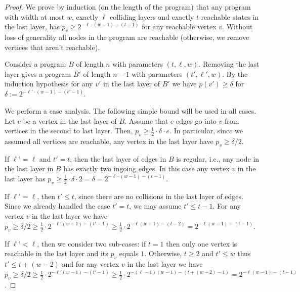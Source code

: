 \begin{proof}
	We prove by induction (on the length of the program) that any program with width at most $w$,  exactly $\ell$ colliding layers and exactly $t$ reachable states in the last layer, has $p_v \ge 2^{-\ell\cdot(w-1) -(t-1)}$ for any reachable vertex $v$.
	Without loss of generality all nodes in the program are reachable (otherwise, we remove vertices that aren't reachable).
	
	Consider a program $B$ of length $n$ with  parameters $(t, \ell,w)$.
	Removing the last layer gives a program $B'$ of length $n-1$ with parameters $(t',\ell',w)$. By the induction hypothesis for any $v'$ in the last layer of $B'$ we have $p(v')\ge \delta$ for $\delta := 2^{-\ell'\cdot(w-1) -(t'-1)}$.
	
	We perform a case analysis. The following simple bound will be used in all cases. Let $v$ be a vertex in the last layer of $B$. Assume that $e$ edges go into $v$ from vertices in the second to last layer. Then, $p_v \ge \frac{1}{2} \cdot \delta \cdot e$. In particular, since we assumed all vertices are reachable, any vertex in the last layer have $p_v \ge \delta/2$. 

	If $\ell'=\ell$ and $t' = t$, then the last layer of edges in $B$ is regular, i.e., any node in the last layer in $B$ has exactly two ingoing edges. In this case any vertex $v$ in the last layer has  $p_v \ge \frac{1}{2} \cdot \delta\cdot 2= \delta = 2^{-\ell\cdot(w-1) - (t-1)}$.
	
	If $\ell'=\ell$, then $t' \le t$, since there are no collisions in the last layer of edges. Since we already handled the case $t'=t$, we may assume $t'\le t-1$.
	For any vertex $v$ in the last layer we have 
	$p_v \ge \delta/2 
	 \ge \frac{1}{2} \cdot 2^{-\ell'(w-1)-(t'-1)}
	 \ge \frac{1}{2} \cdot 2^{-\ell(w-1)-(t-2)} 
	 = 2^{-\ell(w-1)-(t-1)}$.
	
	If $\ell'<\ell$, then we consider two sub-cases:
	if $t = 1$ then only one vertex is reachable in the last layer and its $p_v$ equals $1$.
	Otherwise, $t\ge 2$ and $t'\le w$ thus $t' \le t+(w-2)$ and 
	 for any  vertex $v$ in the last layer we have  $p_v \ge \delta/2
	 \ge \frac{1}{2} \cdot 2^{-\ell'(w-1)-(t'-1)}
	 \ge \frac{1}{2} \cdot 2^{-(\ell-1)(w-1)-(t + (w-2)-1)} 
	 = 2^{-\ell(w-1)-(t-1)}$.
\end{proof}


